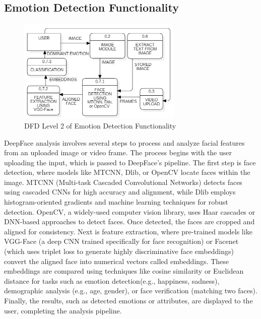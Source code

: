 \pagebreak

\subsection{Emotion Detection Functionality}

\begin{figure}[h!]  
    \centering
    \includegraphics[width=0.7\textwidth]{Images/DFD L2 EMOTION.png}  
    \caption{DFD Level 2 of Emotion Detection Functionality}
    \label{dfdl14456}  %
\end{figure}

\noindent
DeepFace analysis involves several steps to process and analyze facial features from an uploaded image or video frame. The process begins with the user uploading the input, which is passed to DeepFace’s pipeline. The first step is face detection, where models like MTCNN, Dlib, or OpenCV locate faces within the image. MTCNN (Multi-task Cascaded Convolutional Networks) detects faces using cascaded CNNs for high accuracy and alignment, while Dlib employs histogram-oriented gradients and machine learning techniques for robust detection. OpenCV, a widely-used computer vision library, uses Haar cascades or DNN-based approaches to detect faces. Once detected, the faces are cropped and aligned for consistency. Next is feature extraction, where pre-trained models like VGG-Face (a deep CNN trained specifically for face recognition) or Facenet (which uses triplet loss to generate highly discriminative face embeddings) convert the aligned face into numerical vectors called embeddings. These embeddings are compared using techniques like cosine similarity or Euclidean distance for tasks such as emotion detection(e.g., happiness, sadness), demographic analysis (e.g., age, gender), or face verification (matching two faces). Finally, the results, such as detected emotions or attributes, are displayed to the user, completing the analysis pipeline.


